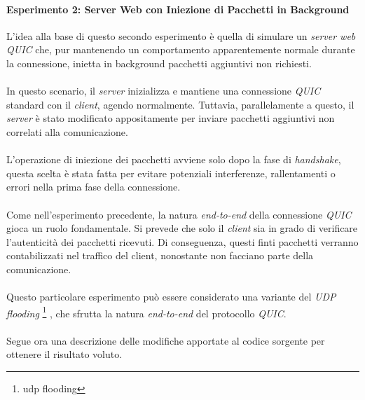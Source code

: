\paragraph{Esperimento 2: Server Web con Iniezione di Pacchetti in Background}
\noindent L'idea alla base di questo secondo esperimento è quella di simulare un \emph{server web QUIC} che, 
pur mantenendo un comportamento apparentemente normale durante la connessione, inietta in background pacchetti aggiuntivi non richiesti.
\\\\
In questo scenario, il \emph{server} inizializza e mantiene una connessione \emph{QUIC} standard con il \emph{client}, agendo normalmente. Tuttavia, parallelamente a questo, il \emph{server} è stato modificato appositamente per inviare pacchetti aggiuntivi non correlati alla comunicazione.
\\\\
L'operazione di iniezione dei pacchetti avviene solo dopo la fase di \emph{handshake}, questa scelta è stata fatta per evitare potenziali interferenze, rallentamenti o errori nella prima fase della connessione. 
\\\\
Come nell'esperimento precedente, la natura \emph{end-to-end} della connessione \emph{QUIC} gioca un ruolo fondamentale. Si prevede che solo il \emph{client} sia in grado di verificare l'autenticità dei pacchetti ricevuti. 
Di conseguenza, questi finti pacchetti verranno contabilizzati nel traffico del client, nonostante non facciano parte della comunicazione.
\\\\
Questo particolare esperimento può essere considerato una variante del \emph{UDP flooding} \footnote{\gls{udp flooding}} \cite{site:udp-flood}, che sfrutta la natura \emph{end-to-end} del protocollo \emph{QUIC}.
\\\\
Segue ora una descrizione delle modifiche apportate al codice sorgente per ottenere il risultato voluto.
